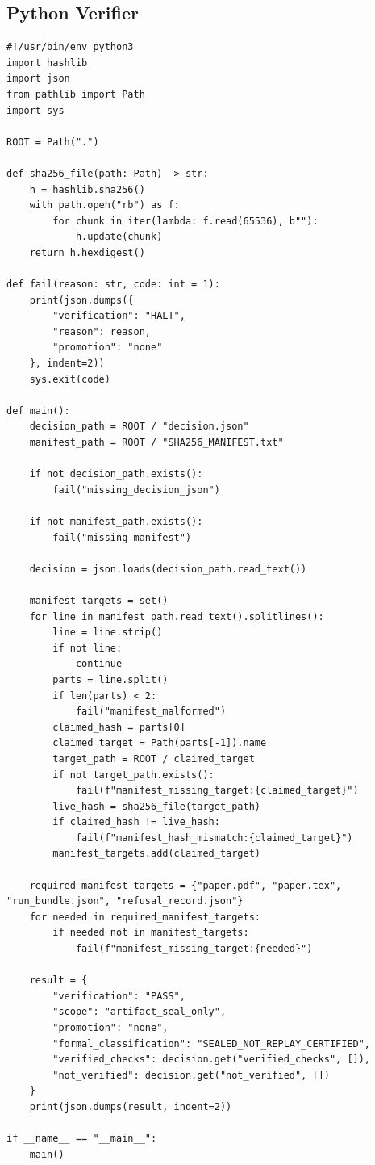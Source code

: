 \documentclass[11pt]{article}
\begin{document}
\subsection{Python Verifier}

\begin{verbatim}
#!/usr/bin/env python3
import hashlib
import json
from pathlib import Path
import sys

ROOT = Path(".")

def sha256_file(path: Path) -> str:
    h = hashlib.sha256()
    with path.open("rb") as f:
        for chunk in iter(lambda: f.read(65536), b""):
            h.update(chunk)
    return h.hexdigest()

def fail(reason: str, code: int = 1):
    print(json.dumps({
        "verification": "HALT",
        "reason": reason,
        "promotion": "none"
    }, indent=2))
    sys.exit(code)

def main():
    decision_path = ROOT / "decision.json"
    manifest_path = ROOT / "SHA256_MANIFEST.txt"

    if not decision_path.exists():
        fail("missing_decision_json")

    if not manifest_path.exists():
        fail("missing_manifest")

    decision = json.loads(decision_path.read_text())

    manifest_targets = set()
    for line in manifest_path.read_text().splitlines():
        line = line.strip()
        if not line:
            continue
        parts = line.split()
        if len(parts) < 2:
            fail("manifest_malformed")
        claimed_hash = parts[0]
        claimed_target = Path(parts[-1]).name
        target_path = ROOT / claimed_target
        if not target_path.exists():
            fail(f"manifest_missing_target:{claimed_target}")
        live_hash = sha256_file(target_path)
        if claimed_hash != live_hash:
            fail(f"manifest_hash_mismatch:{claimed_target}")
        manifest_targets.add(claimed_target)

    required_manifest_targets = {"paper.pdf", "paper.tex", "run_bundle.json", "refusal_record.json"}
    for needed in required_manifest_targets:
        if needed not in manifest_targets:
            fail(f"manifest_missing_target:{needed}")

    result = {
        "verification": "PASS",
        "scope": "artifact_seal_only",
        "promotion": "none",
        "formal_classification": "SEALED_NOT_REPLAY_CERTIFIED",
        "verified_checks": decision.get("verified_checks", []),
        "not_verified": decision.get("not_verified", [])
    }
    print(json.dumps(result, indent=2))

if __name__ == "__main__":
    main()
\end{verbatim}
\end{document}
